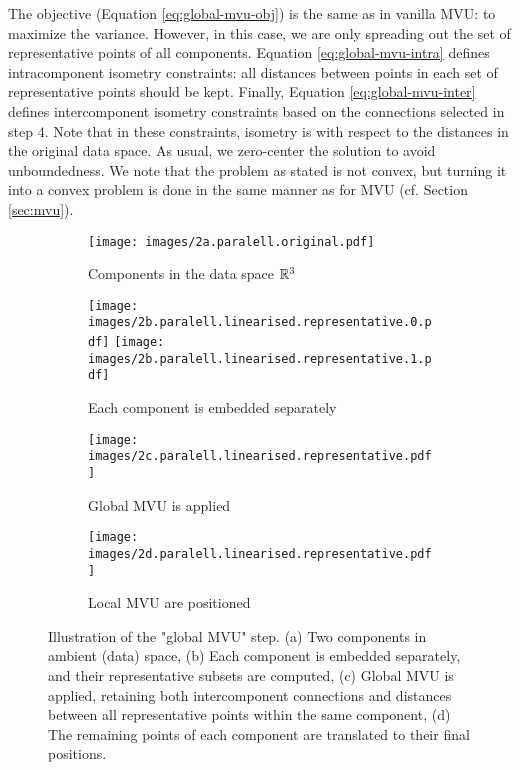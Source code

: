 \documentclass{article} %
\begin{document}
The objective (Equation \ref{eq:global-mvu-obj}) is the same as in vanilla MVU: to maximize the variance. However, in this case, we are only spreading out the set of representative points of all components. Equation \ref{eq:global-mvu-intra} defines intracomponent isometry constraints: all distances between points in each set of representative points should be kept. Finally, Equation \ref{eq:global-mvu-inter} defines intercomponent isometry constraints based on the connections selected in step $4$. Note that in these constraints, isometry is with respect to the distances in the original data space. As usual, we zero-center the solution to avoid unboundedness. We note that the problem as stated is not convex, but turning it into a convex problem is done in the same manner as for MVU (cf. Section \ref{sec:mvu}).

\begin{figure}[t]
\vspace{-10mm}
  \centering
  \begin{subfigure}[b]{0.33\linewidth}
    \centering
    \texttt{[image: images/2a.paralell.original.pdf]}%
    \caption{Components in the data space $\mathbb{R}^3$}
    \label{fig:global-mvu-orig}
  \end{subfigure}\hfill
  \begin{subfigure}[b]{0.24\linewidth}
    \centering
    \texttt{[image: images/2b.paralell.linearised.representative.0.pdf]}
    \vspace{-12mm}
    \label{fig:global-mvu-c1}
    \texttt{[image: images/2b.paralell.linearised.representative.1.pdf]}
    \vspace{-10mm}
    \caption{Each component is embedded separately}
    \label{fig:global-mvu-c2}
  \end{subfigure}\hfill
  \begin{subfigure}[b]{0.39\linewidth}
    \centering
    \texttt{[image: images/2c.paralell.linearised.representative.pdf]}
    \vspace{-20mm}
    \caption{Global MVU is applied}
    \vspace{-12mm}
    \texttt{[image: images/2d.paralell.linearised.representative.pdf]}
    \vspace{-19mm}
    \caption{Local MVU are positioned}
    \label{fig:global-mvu-itself}
  \end{subfigure}
  \caption{Illustration of the "global MVU" step. (a) Two components in ambient (data) space, (b) Each component is embedded separately, and their representative subsets are computed, (c) Global MVU is applied, retaining both intercomponent connections and distances between all representative points within the same component, (d) The remaining points of each component are translated to their final positions.}
  \label{fig:global-mvu}
\end{figure}
\end{document}
